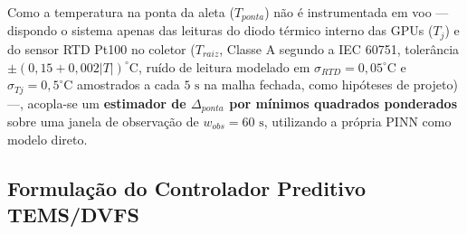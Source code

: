 Como a temperatura na ponta da aleta ($T_{ponta}$) não é instrumentada em voo — dispondo o sistema apenas das leituras do diodo térmico interno das GPUs ($T_j$) e do sensor RTD Pt100 no coletor ($T_{raiz}$, Classe A segundo a IEC 60751, tolerância $\pm(0{,}15 + 0{,}002|T|)^\circ\text{C}$, ruído de leitura modelado em $\sigma_{RTD} = 0{,}05^\circ\text{C}$ e $\sigma_{Tj} = 0{,}5^\circ\text{C}$ amostrados a cada $5\text{ s}$ na malha fechada, como hipóteses de projeto) —, acopla-se um \textbf{estimador de $\Delta_{ponta}$ por mínimos quadrados ponderados} sobre uma janela de observação de $w_{obs} = 60\text{ s}$, utilizando a própria PINN como modelo direto.

\subsection{Formulação do Controlador Preditivo TEMS/DVFS}
\label{sec:formulacao_tems}

